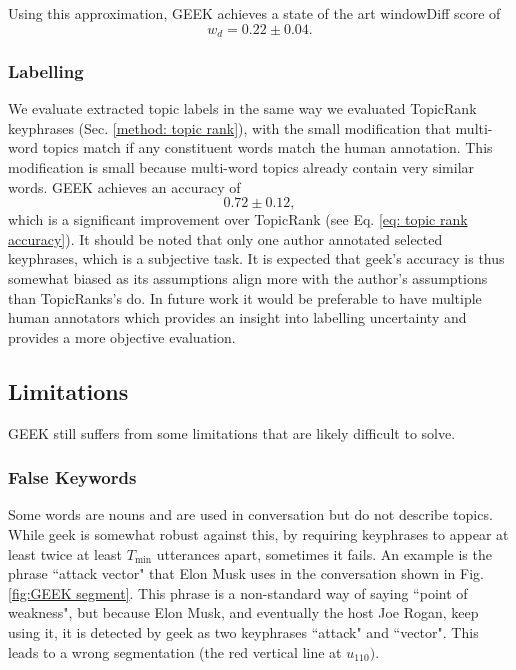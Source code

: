         Using this approximation, GEEK achieves a state of the art windowDiff score of
        \begin{equation}
            w_d = 0.22 \pm 0.04.
        \end{equation}


    \subsubsection{Labelling}
        We evaluate extracted topic labels in the same way we evaluated TopicRank \glspl{keyphrase} (Sec. \ref{method: topic rank}), with the small modification that multi-word topics match if any constituent words match the human annotation. This modification is small because multi-word topics already contain very similar words. GEEK achieves an accuracy of
        \begin{equation}
            0.72 \pm 0.12,
        \end{equation}
        which is a significant improvement over TopicRank (see Eq. \ref{eq: topic rank accuracy}). It should be noted that only one author annotated selected \glspl{keyphrase}, which is a subjective task. It is expected that \gls{geek}'s accuracy is thus somewhat biased as its assumptions align more with the author's assumptions than TopicRanks's do. In future work it would be preferable to have multiple human annotators which provides an insight into labelling uncertainty and provides a more objective evaluation.

    \subsection{Limitations}
    GEEK still suffers from some limitations that are likely difficult to solve.

    \subsubsection{False Keywords}
        Some words are nouns and are used in conversation but do not describe topics. While \gls{geek} is somewhat robust against this, by requiring \glspl{keyphrase} to appear at least twice at least $T_{\text{min}}$ \glspl{utterance} apart, sometimes it fails. An example is the phrase ``attack vector" that Elon Musk uses in the conversation shown in Fig. \ref{fig:GEEK segment}. This phrase is a non-standard way of saying ``point of weakness", but because Elon Musk, and eventually the host Joe Rogan, keep using it, it is detected by \gls{geek} as two \glspl{keyphrase} ``attack" and ``vector". This leads to a wrong segmentation (the red vertical line at $u_{110})$.

